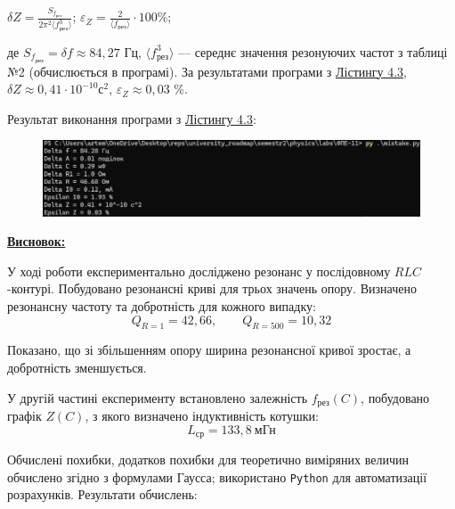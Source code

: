 \documentclass[12pt,a4paper]{article}
\begin{document}
    \begin{center}
        $\displaystyle \delta Z = \frac{S_{f_{\text{рез}}}}{2\pi^2 \text{⟨}f_{\text{рез}}^3\text{⟩}}$;
        $\displaystyle \varepsilon_Z = \frac{2}{\text{⟨}f_{\text{рез}}\text{⟩}}\cdot 100 \%$;
    \end{center}

    де $S_{f_{\text{рез}}} = \delta f \approx 84,27$ Гц, $\text{⟨}f_{\text{рез}}^3\text{⟩}$ --- середнє значення резонуючих частот з таблиці №2 (обчислюється в програмі).
    За результатами програми з \hyperlink{listing3}{Лістингу 4.3}, $\delta Z \approx 0,41 \cdot 10^{-10} \text{с}^2$, $\varepsilon_Z \approx 0,03$ \%.

    \vspace{1em}
    \setlength{\parindent}{0pt}

    Результат виконання програми з \hyperlink{listing3}{Лістингу 4.3}:

    \begin{figure}[ht]
        \includegraphics[width=1.0\textwidth]{mistake_photo.png}
    \end{figure}

    \newpage

    \underline{\textbf{\large Висновок:}}

    \vspace{1em}

    У ході роботи експериментально досліджено резонанс у послідовному $RLC$-контурі. Побудовано резонансні криві для трьох значень опору. Визначено резонансну частоту та добротність для кожного випадку:
    \[
    Q_{R=1} = 42{,}66, \qquad Q_{R=500} = 10{,}32
    \]

    Показано, що зі збільшенням опору ширина резонансної кривої зростає, а добротність зменшується.

    У другій частині експерименту встановлено залежність $f_{\text{рез}}(C)$, побудовано графік $Z(C)$, з якого визначено індуктивність котушки:
    \[
    L_{\text{ср}} = 133{,}8~\text{мГн}
    \]

    Обчислені похибки, додатков похибки для теоретично виміряних величин обчислено згідно з формулами Гаусса; використано \texttt{Python} для автоматизації розрахунків. Результати обчислень:
\end{document}
